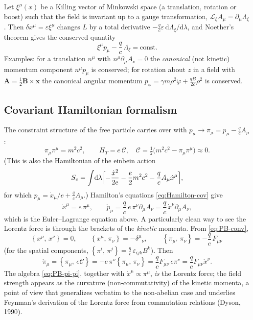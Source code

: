 \documentclass[11pt,a4paper]{book}
\numberwithin{equation}{section}
\newcommand{\dd}{\mathrm{d}}
\newcommand{\PB}[2]{\left\{#1,\,#2\right\}}
\newcommand{\Cc}{\mathcal{C}}          %
\newcommand{\bx}{\mathbf{x}}
\newcommand{\bA}{\mathbf{A}}
\newcommand{\bB}{\mathbf{B}}
\theoremstyle{definition}
\theoremstyle{remark}
\begin{document}
Let $\xi^\mu(x)$ be a Killing vector of Minkowski space (a translation,
rotation or boost) such that the field is invariant up to a gauge
transformation, $\mathcal L_\xi A_\mu=\partial_\mu\Lambda_\xi$.  Then
$\delta x^\mu=\varepsilon\xi^\mu$ changes $L$ by a total derivative
$-\tfrac qc\varepsilon\,\dd\Lambda_\xi/\dd\lambda$, and Noether's theorem gives the
conserved quantity
\begin{equation}
  \xi^\mu p_\mu-\frac qc\,\Lambda_\xi=\text{const}.
  \label{eq:Noether-EM}
\end{equation}
Examples: for a translation $n^\mu$ with $n^\mu\partial_\mu A_\nu=0$ the
\emph{canonical} (not kinetic) momentum component $n^\mu p_\mu$ is
conserved; for rotation about $z$ in a field with $\bA=\tfrac12\bB\times\bx$
the canonical angular momentum $p_\varphi=\gamma m\rho^2\dot\varphi+\tfrac{qB}{2c}\rho^2$ is
conserved.

\subsection{Covariant Hamiltonian formalism}\label{sec:cov-ham}

The constraint structure of the free particle carries over with
$p_\mu\to\pi_\mu=p_\mu-\tfrac qcA_\mu$:
\begin{equation}
  \pi_\mu\pi^\mu=m^2c^2,\qquad
  H_T=e\,\Cc,\quad
  \Cc=\tfrac12\bigl(m^2c^2-\pi_\mu\pi^\mu\bigr)\approx0 .
  \label{eq:HT-EM}
\end{equation}
(This is also the Hamiltonian of the einbein action
\begin{equation}
  S_e=\int\!\dd\lambda\Bigl[-\frac{\dot x^2}{2e}-\frac e2m^2c^2-\frac qc A_\mu\dot x^\mu\Bigr],
  \label{eq:Se-EM}
\end{equation}
for which $p_\mu=\dot x_\mu/e+\tfrac qc A_\mu$.)  Hamilton's equations
\eqref{eq:Hamilton-cov} give
\begin{equation}
  \dot x^\mu=e\,\pi^\mu,\qquad
  \dot p_\mu=\frac qc\,e\,\pi^\nu\partial_\mu A_\nu=\frac qc\,\dot x^\nu\partial_\mu A_\nu,
\end{equation}
which is the Euler--Lagrange equation above.  A particularly clean way to
see the Lorentz force is through the brackets of the \emph{kinetic}
momenta.  From \eqref{eq:PB-conv},
\begin{equation}
  \PB{x^\mu}{x^\nu}=0,\qquad
  \PB{x^\mu}{\pi_\nu}=-\delta^\mu{}_\nu,\qquad
  \boxed{\,\PB{\pi_\mu}{\pi_\nu}=-\frac qc\,F_{\mu\nu}\,}
  \label{eq:PB-pi-pi}
\end{equation}
(for the spatial components, $\PB{\pi^i}{\pi^j}=\tfrac qc\,\varepsilon_{ijk}B^k$).
Then
\begin{equation}
  \dot\pi_\mu=\PB{\pi_\mu}{e\Cc}=-e\,\pi^\nu\PB{\pi_\mu}{\pi_\nu}
  =\frac qc F_{\mu\nu}\,e\pi^\nu=\frac qc F_{\mu\nu}\dot x^\nu .
\end{equation}
The algebra \eqref{eq:PB-pi-pi}, together with $\dot x^\mu\propto\pi^\mu$,
\emph{is} the Lorentz force; the field strength appears as the curvature
(non-commutativity) of the kinetic momenta, a point of view that
generalizes verbatim to the non-abelian case and underlies Feynman's
derivation of the Lorentz force from commutation relations (Dyson, 1990).
\end{document}
